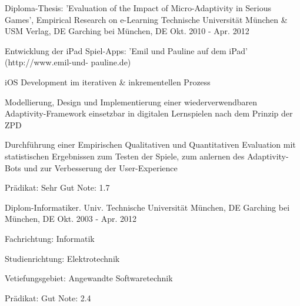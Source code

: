 


\begin{cventries}


\cventry
{Diploma-Thesis: 'Evaluation of the Impact of Micro-Adaptivity in Serious Games', Empirical Research on e-Learning} %
{Technische Universit\"at M\"unchen \& USM Verlag, DE} %
{Garching bei M\"unchen, DE} %
{Okt. 2010 - Apr. 2012} %
{ %
\begin{cvitems}
\item {Entwicklung der iPad Spiel-Apps: 'Emil und Pauline auf dem iPad' (http://www.emil-und- pauline.de)}
\item {iOS Development im iterativen \& inkrementellen Prozess}
\item {Modellierung, Design und Implementierung einer wiederverwendbaren Adaptivity-Framework einsetzbar in digitalen Lernspielen nach dem Prinzip der ZPD}
\item {Durchf\"uhrung einer Empirischen Qualitativen und Quantitativen Evaluation mit statistischen Ergebnissen zum Testen der Spiele, zum anlernen des Adaptivity-Bots und zur Verbesserung der User-Experience}
\item {Pr\"adikat: Sehr Gut {\cdotp} Note: 1.7}
\end{cvitems}
}

\cventry
{Diplom-Informatiker. Univ.} %
{Technische Universit\"at M\"unchen, DE} %
{Garching bei M\"unchen, DE} %
{Okt. 2003 - Apr. 2012} %
{ %
\begin{cvitems}
\item {Fachrichtung: Informatik}
\item {Studienrichtung: Elektrotechnik}
\item {Vetiefungsgebiet: Angewandte Softwaretechnik}
\item {Pr\"adikat: Gut {\cdotp} Note: 2.4}
\end{cvitems}
}


\end{cventries}
